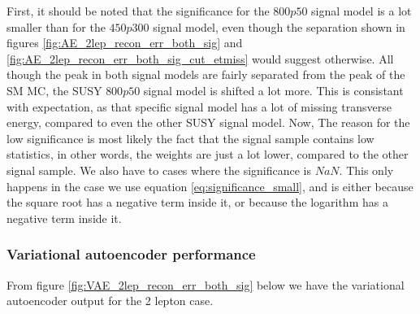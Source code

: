 First, it should be noted that the significance for the $800p50$ signal model is a lot smaller than for the $450p300$ signal model, even though the separation shown in 
figures \ref{fig:AE_2lep_recon_err_both_sig} and \ref{fig:AE_2lep_recon_err_both_sig_cut_etmiss} would suggest otherwise. All though the peak in both signal models are 
fairly separated from the peak of the SM MC, the SUSY $800p50$ signal model is shifted a lot more. This is consistant with expectation, as that specific signal model 
has a lot of missing transverse energy, compared to even the other SUSY signal model. Now, The reason for the low significance is most likely the fact that the signal sample 
contains low statistics, in other words, the weights are just a lot lower, compared to the other signal sample. We also have to cases where the significance is $NaN$. 
This only happens in the case we use equation \ref{eq:significance_small}, and is either because the square root has a negative term inside it, or because the logarithm 
has a negative term inside it. \par

\subsubsection*{Variational autoencoder performance}
From figure \ref{fig:VAE_2lep_recon_err_both_sig} below we have the variational autoencoder output for the 2 lepton case. 


